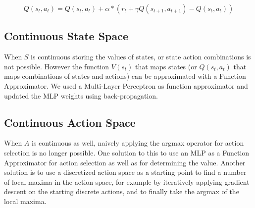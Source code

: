 \begin{equation}
\label{eq:upd_q}
Q(s_t,a_t) = Q(s_t,a_t) + \alpha*(r_t + \gamma Q(s_{t+1},a_{t+1}) - Q(s_t, a_t))
\end{equation}

\subsection{Continuous State Space}

When $S$ is continuous storing the values of states, or state action combinations is not possible. However the function $V(s_t)$ that maps states (or $Q(s_t,a_t)$ that maps combinations
of states and actions) can be approximated with a Function Approximator. We used a Multi-Layer Perceptron as function approximator and updated the MLP weights using back-propagation.

\subsection{Continuous Action Space}

When $A$ is continuous as well, naively applying the argmax operator for action selection is no longer possible. One solution to this to use an MLP as a Function Approximator for action selection as well as
for determining the value. Another solution is to use a discretized action space as a starting point to find a number of local maxima in the action space, for example by iteratively applying gradient descent on the
starting discrete actions, and to finally take the argmax of the local maxima.

